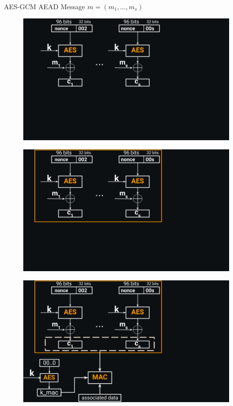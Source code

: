 \documentclass[usenames,dvipsnames, 9pt]{beamer}
\begin{document}
\begin{frame}{AES-GCM AEAD}
\Large Message $m=(m_1, \ldots, m_s)$
{
	\begin{figure}
		\includegraphics[width=\linewidth]{AES_GCM_AEAD_1}
	\end{figure}
}
{
	\begin{figure}
		\includegraphics[width=\linewidth]{AES_GCM_AEAD_2}
	\end{figure}
}
{
	\begin{figure}
		\includegraphics[width=\linewidth]{AES_GCM_AEAD_3}

\end{figure}}
\end{frame}
\end{document}
